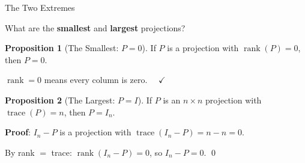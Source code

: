 \documentclass[10pt]{beamer}
\theoremstyle{definition}
\newtheorem{prop}{Proposition}[section]
\newcommand{\x}[1]{\alert{\textbf{#1}}}
\begin{document}
\begin{frame}{The Two Extremes}

What are the \x{smallest} and \x{largest} projections?

\vspace{0.5em}

\begin{prop}[The Smallest: $P = 0$]
If $P$ is a projection with $\operatorname{rank}(P) = 0$, then $P = 0$.
\end{prop}

$\operatorname{rank} = 0$ means every column is zero. $\quad\checkmark$

\vspace{0.5em}

\begin{prop}[The Largest: $P = I$]
If $P$ is an $n \times n$ projection with $\operatorname{trace}(P) = n$, then $P = I_n$.
\end{prop}

\textbf{Proof}: $I_n - P$ is a projection with $\operatorname{trace}(I_n - P) = n - n = 0$.

By rank $=$ trace: $\operatorname{rank}(I_n - P) = 0$, so $I_n - P = 0$. \qed

\end{frame}
\end{document}
